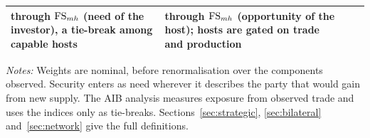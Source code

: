 \begin{table}[tbp]
\begin{threeparttable}
\begin{tabularx}{\textwidth}{@{}>{\raggedright\arraybackslash}p{2.7cm}
  >{\raggedright\arraybackslash}p{2.4cm} >{\raggedright\arraybackslash}X
  >{\raggedright\arraybackslash}X@{}}
  through $\mathrm{FS}_{mh}$ (need of the investor), a tie-break among capable hosts &
  through $\mathrm{FS}_{mh}$ (opportunity of the host); hosts are gated on trade and production\\
\bottomrule
\end{tabularx}
\begin{tablenotes}[flushleft]\footnotesize
\item \textit{Notes:} Weights are nominal, before renormalisation over the components observed.
Security enters as need wherever it describes the party that would gain from new supply. The AIB
analysis measures exposure from observed trade and uses the indices only as tie-breaks. Sections~\ref{sec:strategic}, \ref{sec:bilateral}
and~\ref{sec:network} give the full definitions.
\end{tablenotes}
\end{threeparttable}
\end{table}

